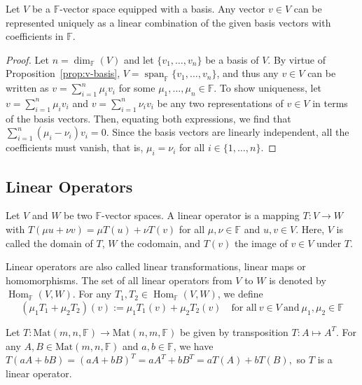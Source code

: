 		\begin{theorem}
			\label{thm:unique-repr}
			Let $V$ be a $\mathbb{F}$-vector space equipped with a basis. Any vector $v \in V$ can be represented uniquely as a linear combination of the given basis vectors with coefficients in $\mathbb{F}$.
		\end{theorem}
		
		\begin{proof}
			Let $n = \dim_{\mathbb{F}}(V)$ and let $\{v_1, \dots, v_n\}$ be a basis of $V$. By virtue of Proposition~\ref{prop:v-basis}, $V = \operatorname{span}_{\mathbb{F}}\{v_1, \dots, v_n\}$, and thus any $v \in V$ can be written as $v = \sum_{i=1}^{n} \mu_i v_i$ for some $\mu_1, \dots, \mu_n \in \mathbb{F}$. To show uniqueness, let $v = \sum_{i=1}^{n} \mu_i v_i$ and $v = \sum_{i=1}^{n} \nu_i v_i$ be any two representations of $v \in V$ in terms of the basis vectors. Then, equating both expressions, we find that $\sum_{i=1}^{n} (\mu_i - \nu_i) v_i = 0$. Since the basis vectors are linearly independent, all the coefficients must vanish, that is, $\mu_i = \nu_i$ for all $i \in \{1, \dots, n\}$.
		\end{proof}
		
	\subsection{Linear Operators}
		
		\begin{definition}
			\label{def:linear-operator}
			Let $V$ and $W$ be two $\mathbb{F}$-vector spaces. A linear operator is a mapping $T : V \to W$ with $T(\mu u + \nu v) = \mu T(u) + \nu T(v)$ for all $\mu, \nu \in \mathbb{F}$ and $u, v \in V$. Here, $V$ is called the domain of $T$, $W$ the codomain, and $T(v)$ the image of $v \in V$ under $T$.
		\end{definition}
		
		\noindent Linear operators are also called linear transformations, linear maps or homomorphisms. The set of all linear operators from $V$ to $W$ is denoted by $\operatorname{Hom}_{\mathbb{F}}(V,W)$. For any $T_1, T_2 \in \operatorname{Hom}_{\mathbb{F}}(V,W)$, we define 
		\[
			(\mu_1 T_1 + \mu_2 T_2)(v) := \mu_1 T_1(v) + \mu_2 T_2(v) \quad \text{for all} \: v \in V \: \text{and} \: \mu_1, \mu_2 \in \mathbb{F}
		\]
		
		\begin{example}
			Let $T : \text{Mat}(m,n,\mathbb{F}) \to \text{Mat}(n,m,\mathbb{F})$ be given by transposition $T : A \mapsto A^T$. For any $A, B \in \text{Mat}(m,n,\mathbb{F})$ and $a, b \in \mathbb{F}$, we have
			\(
				T(aA + bB) = (aA + bB)^T = aA^T + bB^T = aT(A) + bT(B),
			\)
			so $T$ is a linear operator.
		\end{example}
		
